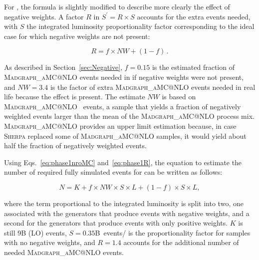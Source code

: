 For \PhaseTwo, the formula is slightly modified to describe more clearly the effect of negative weights. A factor $R$ in $S^{\prime}=R \times S$ accounts for the extra events needed, with $S$ the integrated luminosity proportionality factor corresponding to the ideal case for which negative weights are not present:

\begin{equation}\label{eq:phase1R}
         R = f \times NW + (1-f)  \, .
\end{equation}

As described in Section~\ref{sec:Negative}, $f=0.15$ is the estimated fraction of \textsc{Madgraph\_aMC@NLO} events needed in \RunFour if negative weights were not present, and $NW=3.4$ is the factor of extra \textsc{Madgraph\_aMC@NLO} events needed in real life because the effect is present. The estimate $NW$ is based on \textsc{Madgraph\_aMC@NLO}~\cite{Frederix:2012ps,Alwall:2007fs} \ttbar events, a sample that yields a fraction of negatively weighted events larger than the mean of the \textsc{Madgraph\_aMC@NLO} \RunFour process mix. \textsc{Madgraph\_aMC@NLO} provides an upper limit estimation because, in case \textsc{Sherpa} replaced some of \textsc{Madgraph\_aMC@NLO} samples, it would yield about half the fraction of negatively weighted events. 

Using Eqs.~\eqref{eq:phase1nroMC} and~\eqref{eq:phase1R}, the equation to estimate the number of required fully simulated events for \PhaseTwo can be written as follows:

\begin{equation}\label{eq:phase2nroMC}
        N = K + f \times NW \times S \times L + (1-f) \times S \times L,
\end{equation}

where the term proportional to the integrated luminosity is split into two, one associated with the generators that produce events with negative weights, and a second for the generators that produce events with only positive weights.
$K$ is still 9\unit{B} (\gls{LO}) events, $S=0.35$\unit{B events/\fbinv} is the proportionality factor for samples with no negative weights, and $R=1.4$ accounts for the additional number of needed \textsc{Madgraph\_aMC@NLO} events.

